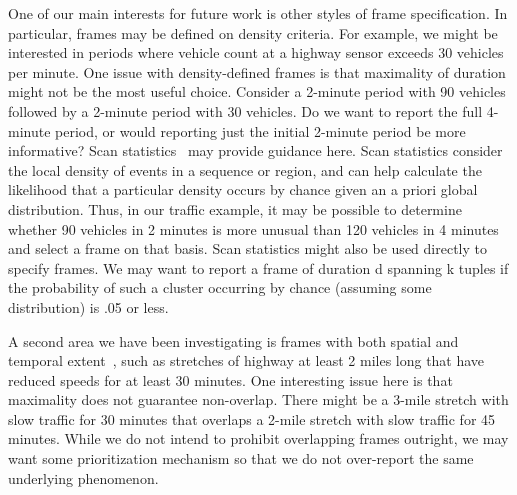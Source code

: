 \documentclass{vldb}
\begin{document}
\begin{appendix}
One of our main interests for future work is other styles of frame specification. In particular, frames may be defined on density criteria. For example, we might be interested in periods where vehicle count at a highway sensor exceeds 30 vehicles per minute. One issue with density-defined frames is that maximality of duration might not be the most useful choice. Consider a 2-minute period with 90 vehicles followed by a 2-minute period with 30 vehicles. Do we want to report the full 4-minute period, or would reporting just the initial 2-minute period be more informative? Scan statistics~\cite{GPW2009} may provide guidance here. Scan statistics consider the local density of events in a sequence or region, and can help calculate the likelihood that a particular density occurs by chance given an a priori global distribution. Thus, in our traffic example, it may be possible to determine whether 90 vehicles in 2 minutes is more unusual than 120 vehicles in 4 minutes and select a frame on that basis. Scan statistics might also be used directly to specify frames. We may want to report a frame of duration d spanning k tuples if the probability of such a cluster occurring by chance (assuming some distribution) is .05 or less. 

A second area we have been investigating is frames with both spatial and temporal extent~\cite{WTB+2010}, such as stretches of highway at least 2 miles long that have reduced speeds for at least 30 minutes. One interesting issue here is that maximality does not guarantee non-overlap. There might be a 3-mile stretch with slow traffic for 30 minutes that overlaps a 2-mile stretch with slow traffic for 45 minutes. While we do not intend to prohibit overlapping frames outright, we may want some prioritization mechanism so that we do not over-report the same underlying phenomenon.
 
\end{appendix}
\end{document}
